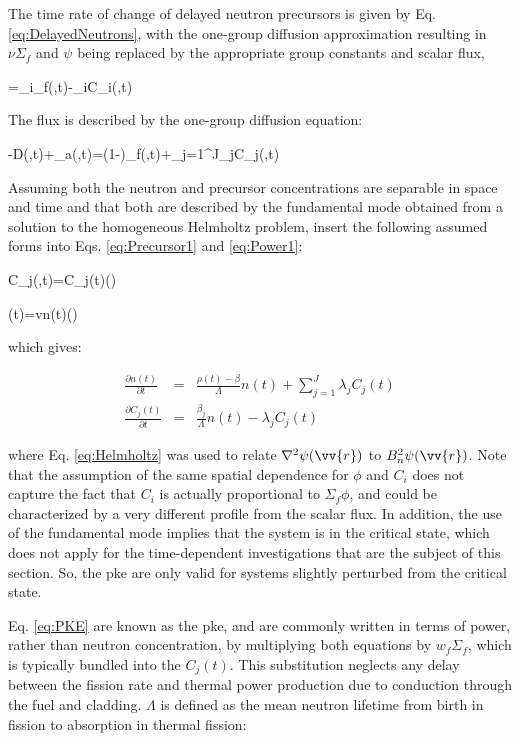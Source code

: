 The time rate of change of delayed neutron precursors is given by Eq. \eqref{eq:DelayedNeutrons}, with the one-group diffusion approximation resulting in \(\nu\Sigma_f\) and \(\psi\) being replaced by the appropriate group constants and scalar flux,

\beq
\label{eq:Precursor1}
=\beta_i\nu\Sigma_f\phi(,t)-\lambda_iC_i(,t)
\eeq

The flux is described by the one-group diffusion equation:

\beq
\label{eq:Power1}
-\nabla\cdot\left\lbrack D\nabla\phi(,t)\right\rbrack+\Sigma_a\phi(,t)=(1-\beta)\nu\Sigma_f\phi(,t)+\sum_{j=1}^J\lambda_jC_j(,t)
\eeq

Assuming both the neutron and precursor concentrations are separable in space and time and that both are described by the fundamental mode obtained from a solution to the homogeneous Helmholtz problem, insert the following assumed forms into Eqs. \eqref{eq:Precursor1} and \eqref{eq:Power1}:

\beq
C_j(,t)=C_j(t)\psi()
\eeq

\beq
\phi(t)=vn(t)\psi()
\eeq

which gives:

\begin{subequations}
\label{eq:PKE}
\begin{eqnarray}
\frac{\partial n(t)}{\partial t}&=&\frac{\rho(t)-\beta}{\Lambda}n(t)+\sum_{j=1}^J\lambda_jC_j(t)\\
\frac{\partial C_j(t)}{\partial t}&=&\frac{\beta_j}{\Lambda}n(t)-\lambda_jC_j(t)
\end{eqnarray}
\end{subequations}

where Eq. \eqref{eq:Helmholtz} was used to relate \(\nabla^2\psi(\vv{r})\) to \(B_n^2\psi(\vv{r})\). Note that the assumption of the same spatial dependence for \(\phi\) and \(C_i\) does not capture the fact that \(C_i\) is actually proportional to \(\Sigma_f\phi\), and could be characterized by a very different profile from the scalar flux. In addition, the use of the fundamental mode implies that the system is in the critical state, which does not apply for the time-dependent investigations that are the subject of this section. So, the \gls{pke} are only valid for systems slightly perturbed from the critical state.

Eq. \eqref{eq:PKE} are known as the \gls{pke}, and are commonly written in terms of power, rather than neutron concentration, by multiplying both equations by \(w_f\Sigma_f\), which is typically bundled into the \(C_j(t)\). This substitution neglects any delay between the fission rate and thermal power production due to conduction through the fuel and cladding. \(\Lambda\) is defined as the mean neutron lifetime from birth in fission to absorption in thermal fission:

